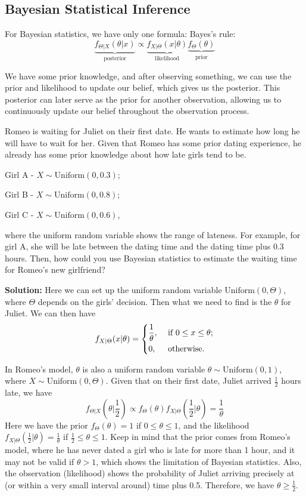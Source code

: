 \subsection{Bayesian Statistical Inference}
For Bayesian statistics, we have only one formula: Bayes’s rule: 
\[
  \underbrace{f_{\Theta \vert X} (\theta \vert x)}_{\text{posterior}} \propto \underbrace{f_{X \vert \Theta} (x \vert \theta)}_{\text{likelihood}} \underbrace{f_{\Theta} (\theta)}_{\text{prior}}
\]

We have some prior knowledge, and after observing something, we can use the prior and likelihood to update our belief, which gives us the posterior. This posterior can later serve as the prior for another observation, allowing us to continuously update our belief throughout the observation process.

\begin{eg}
  Romeo is waiting for Juliet on their first date. He wants to estimate how long he will have to wait for her. Given that Romeo has some prior dating experience, he already has some prior knowledge about how late girls tend to be.
  
  Girl A - \(X \sim \text{Uniform}(0, 0.3)\); 
  
  Girl B - \(X \sim \text{Uniform}(0, 0.8)\); 

  Girl C - \(X \sim \text{Uniform}(0, 0.6)\), 

  where the uniform random variable shows the range of lateness. For example, for girl A, she will be late between the dating time and the dating time plus 0.3 hours. Then, how could you use Bayesian statistics to estimate the waiting time for Romeo's new girlfriend? 

  \textbf{Solution:} 
  Here we can set up the uniform random variable \(\text{Uniform}(0, \Theta)\), where \(\Theta\) depends on the girls' decision. Then what we need to find is the \(\theta\) for Juliet. We can then have 
  \[
    f_{X \vert \Theta}(x \vert \theta) = \begin{dcases}
      \frac{1}{\theta}, &\text{ if } 0 \leq x \leq \theta ;\\
      0, &\text{ otherwise} .
    \end{dcases}
  \]

  In Romeo's model, \(\theta\) is also a uniform random variable \(\theta \sim \text{Uniform}(0, 1)\), where \(X \sim \text{Uniform}(0, \Theta)\). Given that on their first date, Juliet arrived \(\frac{1}{2}\) hours late, we have 
  \[
    f_{\Theta \vert X} (\theta \vert \dfrac{1}{2}) \propto f_\Theta (\theta) f_{X \vert \Theta}(\dfrac{1}{2} \vert \theta) = \dfrac{1}{\theta}
  \]
  Here we have the prior \(f_\Theta(\theta) = 1\) if \(0 \leq \theta \leq 1\), and the likelihood \(f_{X \vert \Theta} (\frac{1}{2} \vert \theta) = \frac{1}{\theta}\) if \(\frac{1}{2} \leq \theta \leq 1\). Keep in mind that the prior comes from Romeo's model, where he has never dated a girl who is late for more than 1 hour, and it may not be valid if \(\theta > 1\), which shows the limitation of Bayesian statistics. Also, the observation (likelihood) shows the probability of Juliet arriving precisely at (or within a very small interval around) time plus 0.5. Therefore, we have \(\theta \geq \frac{1}{2}\). 


\end{eg}
